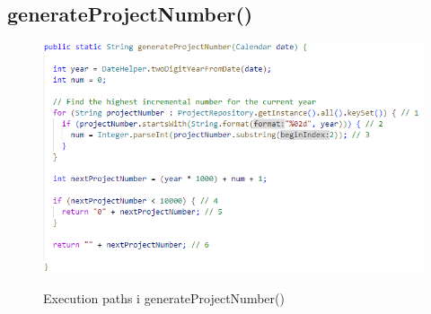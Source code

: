 \subsection{generateProjectNumber()} \label{sec:white_box_generate_project_number}
\begin{figure}[H]
    \centering
    \caption{Execution paths i generateProjectNumber()}
    \includegraphics[width = \textwidth, keepaspectratio]{ImplementationAndTest/Diagrams/wb_genProjNum.png}
    \label{fig:ep_generate_project_number}
\end{figure}
